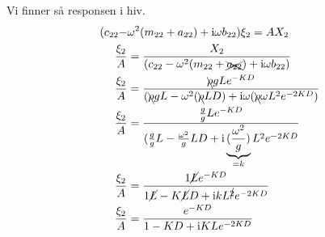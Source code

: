 Vi finner så responsen i hiv. 
\begin{align}
	(c_{22} - &\omega^2(m_{22} + a_{22}) + \mathrm{i}\omega b_{22})\xi_2 = AX_2\\
	 \frac{\xi_{2}}{A} &= \frac{X_2 }{(c_{22} - \omega^2(m_{22} + \xcancel{a_{22}}) + \mathrm{i}\omega b_{22})}\\
	 \frac{\xi_{2}}{A} &= \frac{\bcancel{\rho} g L e^{-KD} }{(\bcancel{\rho} g L - \omega^2(\bcancel{\rho} L D) + \mathrm{i}\omega  (\bcancel{\rho}\omega L^2 e^{-2KD}) }\\
	 \frac{\xi_{2}}{A} &= \frac{ \frac{g}{g} L e^{-KD} }{( \frac{g}{g} L -  \frac{\omega^2}{g}L D + \mathrm{i}\underbrace{(\frac{\omega^2}{g})}_{=k} L^2 e^{-2KD} }\\
	 \frac{\xi_{2}}{A} &= \frac{1 \cancel{L} e^{-KD}}{ 1 \cancel{L} - K \cancel{L} D + \mathrm{i} k {L}^{\cancel{2}} e^{-2KD} }\\
	 \frac{\xi_{2}}{A} &= \frac{ e^{-KD}}{ 1 - K  D + \mathrm{i} K {L} e^{-2KD} }
\end{align}








